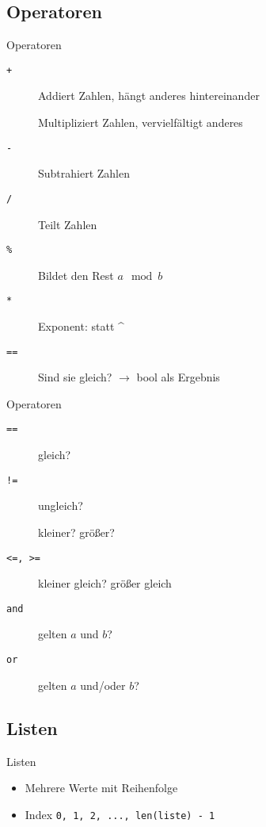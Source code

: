 \subsection{Operatoren}
\begin{frame}{Operatoren}
	\begin{description}
		\item[\tt+] Addiert Zahlen, hängt anderes hintereinander
		\item[\tt*] Multipliziert Zahlen, vervielfältigt anderes
		\item[\tt-] Subtrahiert Zahlen
		\item[\tt/] Teilt Zahlen
		\item[\tt\%] Bildet den Rest $a \mod b$
		\item[\tt**] Exponent: statt \^{}
		\item[\tt==] Sind sie gleich? $\to$ bool als Ergebnis
	\end{description}
\end{frame}
\begin{frame}{Operatoren}
	\begin{description}
		\item[\tt==] gleich?
		\item[\tt!=] ungleich?
		\item[\tt<, >] kleiner? größer?
		\item[\tt<=, >=] kleiner gleich? größer gleich
		\item[\tt and] gelten $a$ und $b$?
		\item[\tt or] gelten $a$ und/oder $b$?
	\end{description}
\end{frame}

\subsection{Listen}
\begin{frame}{Listen}
	\begin{itemize}
		\item Mehrere Werte mit Reihenfolge
		\item Index \texttt{0, 1, 2, ..., len(liste) - 1}
	\end{itemize}
\end{frame}

